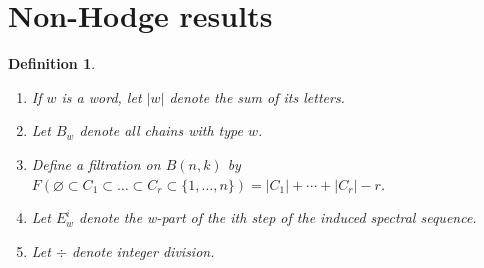 \documentclass{article}
\newtheorem{definition}[theorem]{Definition}
\begin{document}
\section{Non-Hodge results}\label{S:Non}
  \begin{definition} 
     

     \begin{enumerate}
        \item If $w$ is a word, let $|w|$ denote the sum of its letters.
        \item Let $B_w$ denote all chains with type $w$.
        \item Define a filtration on $B(n, k)$ by $F(\varnothing \subset C_1 \subset \ldots 
           \subset C_r \subset \{1, \ldots, n\}) = |C_1| + \cdots + |C_r| - r$.
        \item Let $E^i_w$ denote the w-part of the ith step of the induced spectral sequence.
        \item Let $\div$ denote integer division.
     \end{enumerate}
  \end{definition}
\end{document}
